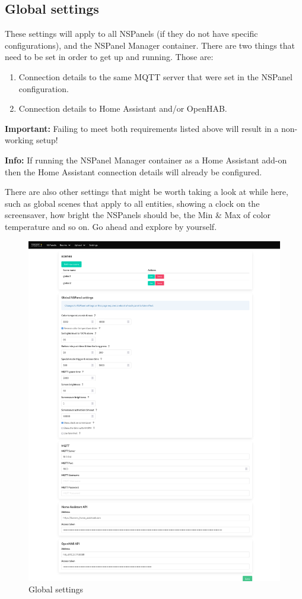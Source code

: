 \documentclass[10pt]{article}
\newcommand{\info}[1]{\begin{infoBox} \textbf{Info:} #1 \end{infoBox}}
\newcommand{\important}[1]{\begin{importantBox} \textbf{Important:} #1 \end{importantBox}}
\begin{document}
    \subsection{Global settings}
    These settings will apply to all NSPanels (if they do not have specific configurations), and the NSPanel Manager container. There are two things that need to be set in order to get up and running. Those are:
    \begin{enumerate}
      \item Connection details to the same MQTT server that were set in the NSPanel configuration.
      \item Connection details to Home Assistant and/or OpenHAB.
    \end{enumerate}
    \important{Failing to meet both requirements listed above will result in a non-working setup!}
    \info{If running the NSPanel Manager container as a Home Assistant add-on then the Home Assistant connection details will already be configured.}
    There are also other settings that might be worth taking a look at while here, such as global scenes that apply to all entities, showing a clock on the screensaver, how bright the NSPanels should be, the Min \& Max of color temperature and so on. Go ahead and explore by yourself.
    \begin{figure}[H]
    \centering
    \includegraphics[scale=0.25]{settings_page.png}
    \caption{Global settings}%
    \end{figure}
\end{document}
